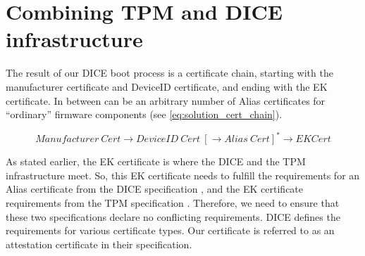 




\section{Combining TPM and DICE infrastructure}

The result of our DICE boot process is a certificate chain, starting with the manufacturer certificate and DeviceID certificate, and ending with the EK certificate.
In between can be an arbitrary number of Alias certificates for ``ordinary'' firmware components (see \autoref{eq:solution_cert_chain}).

\begin{equation}
\label{eq:solution_cert_chain}
Manufacturer\ Cert \rightarrow DeviceID\ Cert\ [\rightarrow Alias\ Cert]^* \rightarrow EK Cert
\end{equation}

As stated earlier, the EK certificate is where the DICE and the TPM infrastructure meet.
So, this EK certificate needs to fulfill the requirements for an Alias certificate from the DICE specification \cite{DICE_certs}, and the EK certificate requirements from the TPM specification \cite{tcg-ek}.
Therefore, we need to ensure that these two specifications declare no conflicting requirements.
DICE \cite{DICE_certs} defines the requirements for various certificate types.
Our certificate is referred to as an attestation certificate in their specification.

